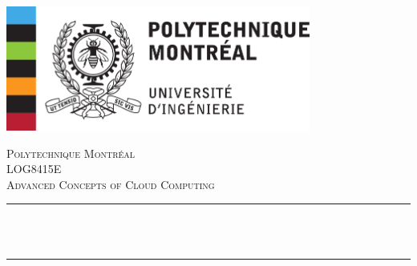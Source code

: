 \begin{titlepage}

\newcommand{\HRule}{\rule{\linewidth}{0.5mm}} %

\center
\includegraphics[width=10cm]{Title/polytechnique.png}\\[1cm] %
 

\center %


\textsc{\LARGE Polytechnique Montréal }\\[1.5cm] %
\textsc{\Large LOG8415E}\\[0.5cm] %
\textsc{\large Advanced Concepts of Cloud Computing}\\[0.5cm] %

\makeatletter
\HRule \\[0.4cm]
{ \huge \bfseries \@title}\\[0.4cm] %
\HRule \\[1.5cm]
 


\end{titlepage}
